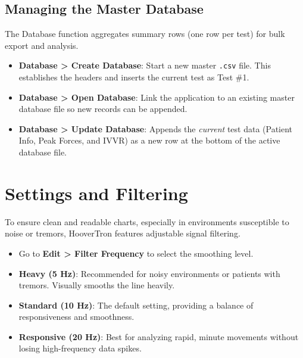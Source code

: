 \documentclass[11pt,a4paper]{article}
\begin{document}
\subsection{Managing the Master Database}
The Database function aggregates summary rows (one row per test) for bulk export and analysis.
\begin{itemize}
    \item \textbf{Database > Create Database}: Start a new master \texttt{.csv} file. This establishes the headers and inserts the current test as Test \#1.
    \item \textbf{Database > Open Database}: Link the application to an existing master database file so new records can be appended.
    \item \textbf{Database > Update Database}: Appends the \textit{current} test data (Patient Info, Peak Forces, and IVVR) as a new row at the bottom of the active database file.
\end{itemize}

\section{Settings and Filtering}
To ensure clean and readable charts, especially in environments susceptible to noise or tremors, HooverTron features adjustable signal filtering.

\begin{itemize}
    \item Go to \textbf{Edit > Filter Frequency} to select the smoothing level.
    \item \textbf{Heavy (5 Hz)}: Recommended for noisy environments or patients with tremors. Visually smooths the line heavily.
    \item \textbf{Standard (10 Hz)}: The default setting, providing a balance of responsiveness and smoothness.
    \item \textbf{Responsive (20 Hz)}: Best for analyzing rapid, minute movements without losing high-frequency data spikes.
\end{itemize}
\end{document}
